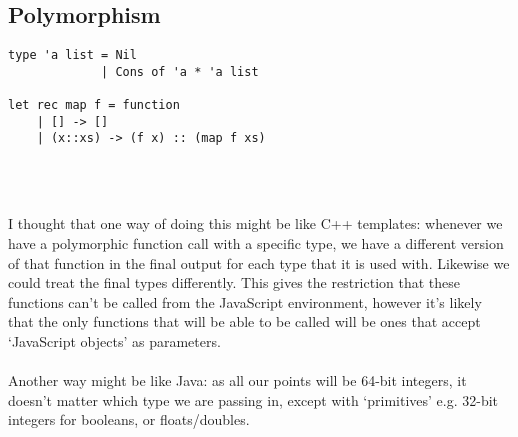 \documentclass{report}
\begin{document}
\subsection{Polymorphism}
\begin{minipage}{0.4\linewidth}
\begin{verbatim}
type 'a list = Nil
             | Cons of 'a * 'a list

let rec map f = function
    | [] -> []
    | (x::xs) -> (f x) :: (map f xs)
\end{verbatim}
\end{minipage}  
\begin{minipage}{0.6\linewidth}
\begin{verbatim}

\end{verbatim}
\end{minipage}
\\\\
I thought that one way of doing this might be like C++ templates: whenever we have a polymorphic function call with a specific type, we have a different version of that function in the final output for each type that it is used with. Likewise we could treat the final types differently. This gives the restriction that these functions can't be called from the JavaScript environment, however it's likely that the only functions that will be able to be called will be ones that accept `JavaScript objects' as parameters.
\\\\
Another way might be like Java: as all our points will be 64-bit integers, it doesn't matter which type we are passing in, except with `primitives' e.g. 32-bit integers for booleans, or floats/doubles.
\end{document}

